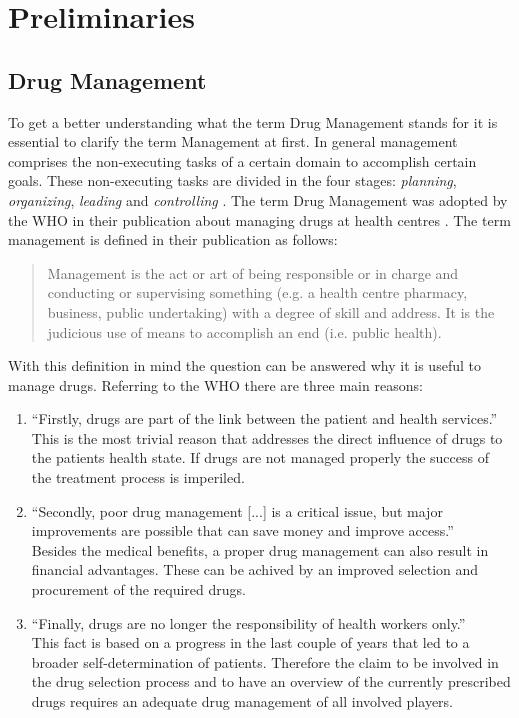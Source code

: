 \chapter{Preliminaries}
\label{cha:prelims}

\section{Drug Management}
\label{sec:drug-management}

To get a better understanding what the term Drug Management stands for it is essential to clarify the term Management at first.
In general management comprises the non-executing tasks of a certain domain to accomplish certain goals.
These non-executing tasks are divided in the four stages: \textit{planning}, \textit{organizing}, \textit{leading} and \textit{controlling} \cite{robbins2007fundamentals}.
The term Drug Management was adopted by the WHO in their publication about managing drugs at health centres \cite{who2004}.
The term management is defined in their publication as follows: 
\begin{quote}
  Management is the act or art of being responsible or in charge and conducting or supervising something (e.g. a health centre pharmacy, business, public undertaking) with a degree of skill and address. It is the judicious use of means to accomplish an end (i.e. public health).
\end{quote}
With this definition in mind the question can be answered why it is useful to manage drugs.
Referring to the WHO there are three main reasons:
\begin{enumerate}
\item ``Firstly, drugs are part of the link between the patient and health services.''\\
  This is the most trivial reason that addresses the direct influence of drugs to the patients health state. If drugs are not managed properly the success of the treatment process is imperiled. 
\item ``Secondly, poor drug management [...] is a critical issue, but major improvements are possible that can save money and improve access.''\\
  Besides the medical benefits, a proper drug management can also result in financial advantages. These can be achived by an improved selection and procurement of the required drugs.
\item ``Finally, drugs are no longer the responsibility of health workers only.''\\
  This fact is based on a progress in the last couple of years that led to a broader self-determination of patients. 
  Therefore the claim to be involved in the drug selection process and to have an overview of the currently prescribed drugs requires an adequate drug management of all involved players.
\end{enumerate}
